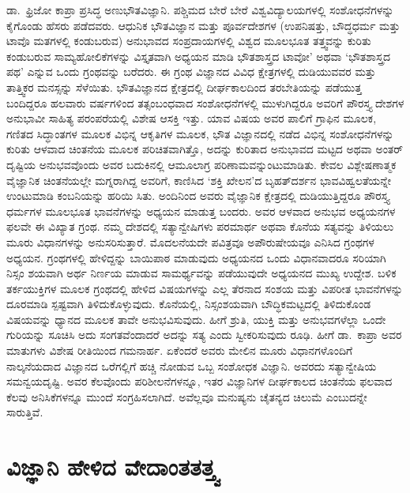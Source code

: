 ಡಾ.\ ಫ್ರಿಜೋ ಕಾಪ್ರಾ ಪ್ರಸಿದ್ಧ ಅಣುಭೌತವಿಜ್ಞಾನಿ. ಪಶ್ಚಿಮದ ಬೇರೆ ಬೇರೆ ವಿಶ್ವವಿದ್ಯಾಲಯಗಳಲ್ಲಿ ಸಂಶೋಧನೆಗಳನ್ನು ಕೈಗೊಂಡು ಹೆಸರು ಪಡೆದವರು. ಆಧುನಿಕ ಭೌತವಿಜ್ಞಾನ ಮತ್ತು ಪೂರ್ವದೇಶಗಳ (ಉಪನಿಷತ್ತು, ಬೌದ್ಧಧರ್ಮ ಮತ್ತು ಟಾವೊ ಮತಗಳಲ್ಲಿ ಕಂಡುಬರುವ) ಅನುಭಾವದ ಸಂಪ್ರದಾಯಗಳಲ್ಲಿ ವಿಶ್ವದ ಮೂಲಭೂತ ತತ್ತ್ವವನ್ನು ಕುರಿತು ಕಂಡುಬರುವ ಸಾಮ್ಯಹೋಲಿಕೆಗಳನ್ನು ವಿಸ್ತೃತವಾಗಿ ಅಧ್ಯಯನ ಮಾಡಿ ಭೌತಶಾಸ್ತ್ರದ ಟಾವೋ’ ಅಥವಾ ‘ಭೌತಶಾಸ್ತ್ರದ ಪಥ’ ಎನ್ನುವ ಒಂದು ಗ್ರಂಥವನ್ನು ಬರೆದರು. ಈ ಗ್ರಂಥ ವಿಜ್ಞಾನದ ವಿವಿಧ ಕ್ಷೇತ್ರಗಳಲ್ಲಿ ದುಡಿಯುವವರ ಮತ್ತು ತಾತ್ತ್ವಿಕರ ಮನಸ್ಸನ್ನು ಸೆಳೆಯಿತು. ಭೌತವಿಜ್ಞಾನದ ಕ್ಷೇತ್ರದಲ್ಲಿ ದೀರ್ಘಕಾಲದಿಂದ ತರಬೇತಿಯನ್ನು ಪಡೆಯುತ್ತ ಬಂದಿದ್ದರೂ ಹಲವಾರು ವರ್ಷಗಳಿಂದ ತತ್ಸಂಬಂಧವಾದ ಸಂಶೋಧನೆಗಳಲ್ಲಿ ಮುಳುಗಿದ್ದರೂ ಅವರಿಗೆ ಪೌರಸ್ತ್ಯ ದೇಶಗಳ ಅನುಭಾವೀ ಸಾಹಿತ್ಯ ಪರಂಪರೆಯಲ್ಲಿ ವಿಶೇಷ ಆಸಕ್ತಿ ಇತ್ತು. ಯಾವ ವಿಷಯ ಅವರ ಪಾಲಿಗೆ ಗ್ರಾಫಿನ ಮೂಲಕ, ಗಣಿತದ ಸಿದ್ಧಾಂತಗಳ ಮೂಲಕ ವಿಭಿನ್ನ ಆಕೃತಿಗಳ ಮೂಲಕ, ಭೌತ ವಿಜ್ಞಾನದಲ್ಲಿ ನಡೆದ ವಿಭಿನ್ನ ಸಂಶೋಧನೆಗಳನ್ನು ಕುರಿತು ಆಳವಾದ ಚಿಂತನೆಯ ಮೂಲಕ ಪರಿಚಿತವಾಗಿತ್ತೊ, ಅದನ್ನು ಕುರಿತಾದ ಅನುಭಾವದ ಮಟ್ಟದ ಅಥವಾ ಅಂತರ್ ದೃಷ್ಟಿಯ ಅನುಭವವೊಂದು ಅವರ ಬದುಕಿನಲ್ಲಿ ಆಮೂಲಾಗ್ರ ಪರಿಣಾಮವನ್ನುಂಟುಮಾಡಿತು. ಕೇವಲ ವಿಶ್ಲೇಷಣಾತ್ಮಕ ವೈಜ್ಞಾನಿಕ ಚಿಂತನೆಯಲ್ಲೇ ಮಗ್ನರಾಗಿದ್ದ ಅವರಿಗೆ, ಕಾಣಿಸಿದ ‘ಶಕ್ತಿ ಖೇಲನ’ದ ಬೃಹತ್​ದರ್ಶನ ಭಾವವಿಹ್ವಲತೆಯನ್ನೇ ಉಂಟುಮಾಡಿ ಕಂಬನಿಯನ್ನು ಹರಿಯಿ ಸಿತು. ಅಂದಿನಿಂದ ಅವರು ವೈಜ್ಞಾನಿಕ ಕ್ಷೇತ್ರದಲ್ಲಿ ದುಡಿಯುತ್ತಿದ್ದರೂ ಪೌರಸ್ತ್ಯ ಧರ್ಮಗಳ ಮೂಲಭೂತ ಭಾವನೆಗಳನ್ನು ಅಧ್ಯಯನ ಮಾಡುತ್ತ ಬಂದರು. ಅವರ ಆಳವಾದ ಅನುಭವ ಅಧ್ಯಯನಗಳ ಫಲವೇ ಈ ವಿಖ್ಯಾತ ಗ್ರಂಥ. ನಮ್ಮ ದೇಶದಲ್ಲಿ ಸತ್ಯಾನ್ವೇಷಿಗಳು ಪರಮಾರ್ಥ ಅಥವಾ ಕೊನೆಯ ಸತ್ಯವನ್ನು ತಿಳಿಯಲು ಮೂರು ವಿಧಾನಗಳನ್ನು ಅನುಸರಿಸುತ್ತಾರೆ. ಮೊದಲನೆಯದೇ ಪವಿತ್ರವೂ ಅಪೌರುಷೇಯವೂ ಎನಿಸಿದ ಗ್ರಂಥಗಳ ಅಧ್ಯಯನ. ಗ್ರಂಥಗಳಲ್ಲಿ ಹೇಳಿದ್ದನ್ನು ಬಾಯಿಪಾಠ ಮಾಡುವುದು ಅಧ್ಯಯನದ ಒಂದು ವಿಧಾನವಾದರೂ ಸರಿಯಾಗಿ ನಿಸ್ಸಂ ಶಯವಾಗಿ ಅರ್ಥ ನಿರ್ಣಯ ಮಾಡುವ ಸಾಮರ್ಥ್ಯವನ್ನು ಪಡೆಯುವುದೇ ಅಧ್ಯಯನದ ಮುಖ್ಯ ಉದ್ದೇಶ. ಬಳಿಕ ತರ್ಕಯುಕ್ತಿಗಳ ಮೂಲಕ ಗ್ರಂಥದಲ್ಲಿ ಹೇಳಿದ ವಿಷಯಗಳನ್ನು ಎಲ್ಲ ತೆರನಾದ ಸಂಶಯ ಮತ್ತು ವಿಪರೀತ ಭಾವನೆಗಳನ್ನು ದೂರಮಾಡಿ ಸ್ಪಷ್ಟವಾಗಿ ತಿಳಿದುಕೊಳ್ಳುವುದು. ಕೊನೆಯಲ್ಲಿ, ನಿಸ್ಸಂಶಯವಾಗಿ ಬೌದ್ಧಿಕಮಟ್ಟದಲ್ಲಿ ತಿಳಿದುಕೊಂಡ ವಿಷಯವನ್ನು ಧ್ಯಾನದ ಮೂಲಕ ತಾವೇ ಅನುಭವಿಸುವುದು. ಹೀಗೆ ಶ್ರುತಿ, ಯುಕ್ತಿ ಮತ್ತು ಅನುಭವಗಳೆಲ್ಲಾ ಒಂದೇ ಗುರಿಯನ್ನು ಸೂಚಿಸಿ ಅದು ಸಂಗತವೆಂದಾದರೆ ಅದನ್ನು ಸತ್ಯ ಎಂದು ಸ್ವೀಕರಿಸುವುದು ರೂಢಿ. ಹೀಗೆ ಡಾ.\ ಕಾಪ್ರಾ ಅವರ ಮಾತುಗಳು ವಿಶೇಷ ರೀತಿಯಿಂದ ಗಮನಾರ್ಹ. ಏಕೆಂದರೆ ಅವರು ಮೇಲಿನ ಮೂರು ವಿಧಾನಗಳೊಂದಿಗೆ ನಾಲ್ಕನೆಯದಾದ ವಿಜ್ಞಾನದ ಒರೆಗಲ್ಲಿಗೆ ಹಚ್ಚಿ ನೋಡುವ ಒಬ್ಬ ಸಂಶೋಧಕ ವಿಜ್ಞಾನಿ. ಅವರದು ಸತ್ಯಾನ್ವೇಷಿಯ ಸಮನ್ವಯದೃಷ್ಟಿ. ಅವರ ಕೆಲವೊಂದು ಪರಿಶೀಲನೆಗಳನ್ನೂ, ಇತರ ವಿಜ್ಞಾನಿಗಳ ದೀರ್ಘಕಾಲದ ಚಿಂತನೆಯ ಫಲವಾದ ಕೆಲವು ಅನಿಸಿಕೆಗಳನ್ನೂ ಮುಂದೆ ಸಂಗ್ರಹಿಸಲಾಗಿದೆ. ಅವೆಲ್ಲವೂ ಮನುಷ್ಯನು ಚೈತನ್ಯದ ಚಿಲುಮೆ ಎಂಬುದನ್ನೇ ಸಾರುತ್ತಿವೆ.


\section*{ವಿಜ್ಞಾನಿ ಹೇಳಿದ ವೇದಾಂತತತ್ತ್ವ}


